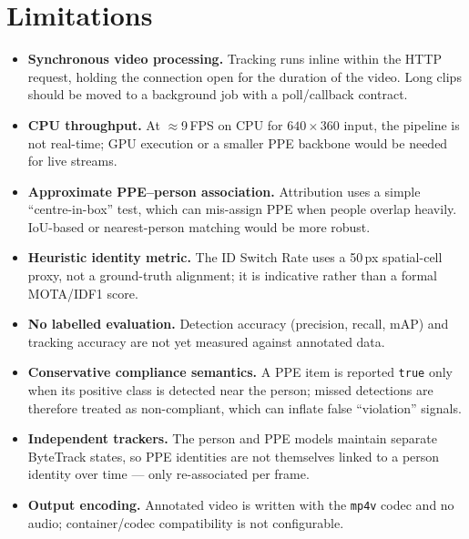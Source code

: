 \documentclass[11pt,a4paper]{article}
\begin{document}
\section{Limitations}

\begin{itemize}
  \item \textbf{Synchronous video processing.} Tracking runs inline within the
        HTTP request, holding the connection open for the duration of the
        video. Long clips should be moved to a background job with a
        poll/callback contract.
  \item \textbf{CPU throughput.} At $\approx$9\,FPS on CPU for $640\times360$
        input, the pipeline is not real-time; GPU execution or a smaller PPE
        backbone would be needed for live streams.
  \item \textbf{Approximate PPE--person association.} Attribution uses a simple
        ``centre-in-box'' test, which can mis-assign PPE when people overlap
        heavily. IoU-based or nearest-person matching would be more robust.
  \item \textbf{Heuristic identity metric.} The ID Switch Rate uses a 50\,px
        spatial-cell proxy, not a ground-truth alignment; it is indicative
        rather than a formal MOTA/IDF1 score.
  \item \textbf{No labelled evaluation.} Detection accuracy (precision, recall,
        mAP) and tracking accuracy are not yet measured against annotated data.
  \item \textbf{Conservative compliance semantics.} A PPE item is reported
        \verb|true| only when its positive class is detected near the person;
        missed detections are therefore treated as non-compliant, which can
        inflate false ``violation'' signals.
  \item \textbf{Independent trackers.} The person and PPE models maintain
        separate ByteTrack states, so PPE identities are not themselves linked
        to a person identity over time --- only re-associated per frame.
  \item \textbf{Output encoding.} Annotated video is written with the
        \verb|mp4v| codec and no audio; container/codec compatibility is not
        configurable.
\end{itemize}
\end{document}
